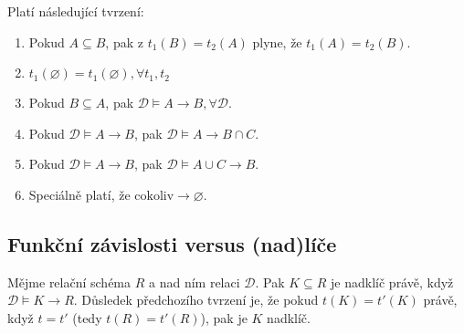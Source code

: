 \begin{upquote}
Platí následující tvrzení:
\begin{enumerate}
\item Pokud $A \subseteq B$, pak z $t_{1}(B) = t_{2}(A)$ plyne, že $t_{1}(A) = t_{2}(B)$.
\item $t_{1}(\varnothing) = t_{1}(\varnothing), \forall t_{1}, t_{2}$
\item Pokud $B \subseteq A$, pak $\mathcal{D} \vDash A \to B, \forall \mathcal{D}$.
\item Pokud $\mathcal{D} \vDash A \to B$, pak $\mathcal{D} \vDash A \to B \cap C$.
\item Pokud $\mathcal{D} \vDash A \to B$, pak $\mathcal{D} \vDash A \cup C \to B$.
\item Speciálně platí, že $\text{cokoliv} \to \varnothing$.
\end{enumerate}
\end{upquote}

\subsection{Funkční závislosti versus (nad)líče}
Mějme relační schéma $R$ a nad ním relaci $\mathcal{D}$. Pak $K \subseteq R$ je nadklíč právě, když $\mathcal{D} \vDash K \to R$. Důsledek předchozího tvrzení je, že pokud $t(K) = t'(K)$ právě, když $t = t'$ (tedy $t(R) = t'(R)$), pak je $K$ nadklíč.


